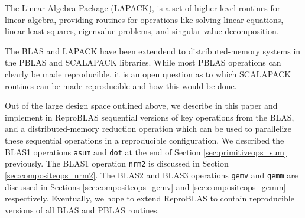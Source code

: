   The Linear Algebra Package (LAPACK), is a set of higher-level
  routines for linear algebra, providing routines for operations like solving linear equations, linear least squares, eigenvalue problems, and singular value decomposition.

  The BLAS and LAPACK have been extendend to distributed-memory systems in the PBLAS and SCALAPACK libraries. While most PBLAS operations can clearly be made reproducible, it is an open question as to which SCALAPACK routines can be made reproducible and how this would be done. 

  Out of the large design space outlined above, we describe in this paper and implement in ReproBLAS sequential versions of key operations from the BLAS, and a distributed-memory reduction operation which can be used to parallelize these sequential operations in a reproducible configuration. We described the BLAS1 operations \texttt{asum} and \texttt{dot} at the end of Section \ref{sec:primitiveops_sum} previously. The BLAS1 operation \texttt{nrm2} is discussed in Section \ref{sec:compositeops_nrm2}. The BLAS2 and BLAS3 operations \texttt{gemv} and \texttt{gemm} are discussed in Sections \ref{sec:compositeops_gemv} and \ref{sec:compositeops_gemm} respectively. Eventually, we hope to extend ReproBLAS to contain reproducible versions of all BLAS and PBLAS routines.

    
    
    
    
